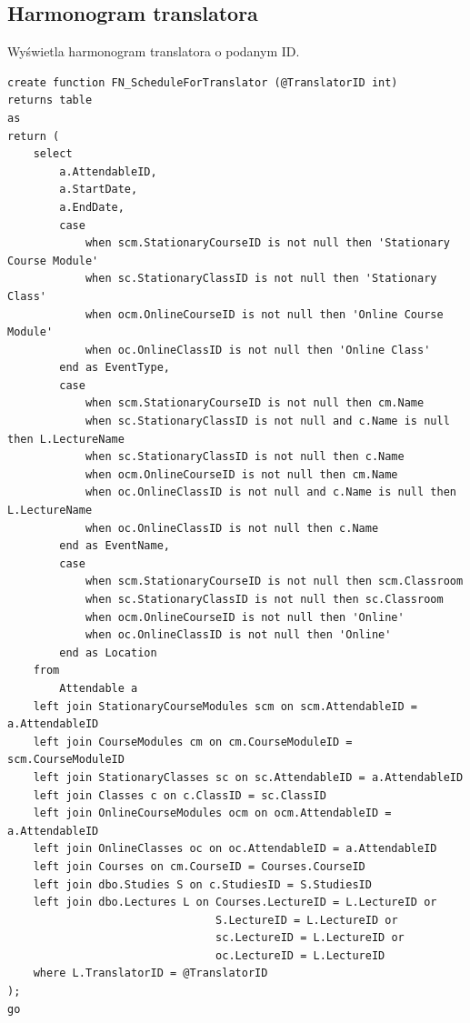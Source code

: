 \documentclass[11pt,a4paper]{article}
\begin{document}
\subsection{Harmonogram translatora}
Wyświetla harmonogram translatora o podanym ID.
\begin{Verbatim}[breaklines=true]
create function FN_ScheduleForTranslator (@TranslatorID int)
returns table
as
return (
    select
        a.AttendableID,
        a.StartDate,
        a.EndDate,
        case
            when scm.StationaryCourseID is not null then 'Stationary Course Module'
            when sc.StationaryClassID is not null then 'Stationary Class'
            when ocm.OnlineCourseID is not null then 'Online Course Module'
            when oc.OnlineClassID is not null then 'Online Class'
        end as EventType,
        case
            when scm.StationaryCourseID is not null then cm.Name
            when sc.StationaryClassID is not null and c.Name is null then L.LectureName
            when sc.StationaryClassID is not null then c.Name
            when ocm.OnlineCourseID is not null then cm.Name
            when oc.OnlineClassID is not null and c.Name is null then L.LectureName
            when oc.OnlineClassID is not null then c.Name
        end as EventName,
        case
            when scm.StationaryCourseID is not null then scm.Classroom
            when sc.StationaryClassID is not null then sc.Classroom
            when ocm.OnlineCourseID is not null then 'Online'
            when oc.OnlineClassID is not null then 'Online'
        end as Location
    from
        Attendable a
    left join StationaryCourseModules scm on scm.AttendableID = a.AttendableID
    left join CourseModules cm on cm.CourseModuleID = scm.CourseModuleID
    left join StationaryClasses sc on sc.AttendableID = a.AttendableID
    left join Classes c on c.ClassID = sc.ClassID
    left join OnlineCourseModules ocm on ocm.AttendableID = a.AttendableID
    left join OnlineClasses oc on oc.AttendableID = a.AttendableID
    left join Courses on cm.CourseID = Courses.CourseID
    left join dbo.Studies S on c.StudiesID = S.StudiesID
    left join dbo.Lectures L on Courses.LectureID = L.LectureID or
                                S.LectureID = L.LectureID or
                                sc.LectureID = L.LectureID or
                                oc.LectureID = L.LectureID
    where L.TranslatorID = @TranslatorID
);
go
\end{Verbatim}
\end{document}
